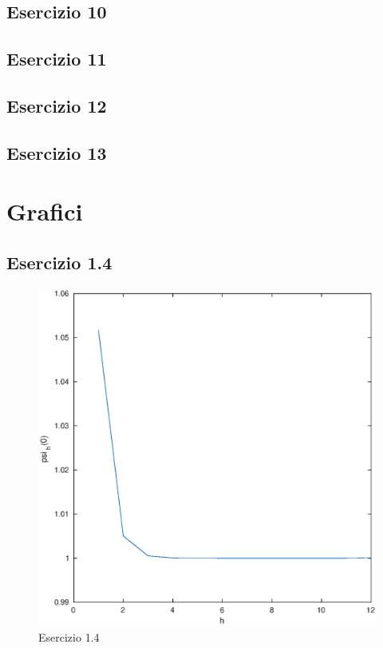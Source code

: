 \documentclass[11pt]{extarticle}
\begin{document}
\subsection{Esercizio 10}

\subsection{Esercizio 11}

\subsection{Esercizio 12}

\subsection{Esercizio 13}


\newpage

\section{\textbf{Grafici}}
\subsection{Esercizio 1.4}
\begin{figure}[h]
\caption{Esercizio 1.4}
\label{fes14}
\includegraphics[width=\textwidth]{plot/fes14}
\end{figure}
\end{document}
